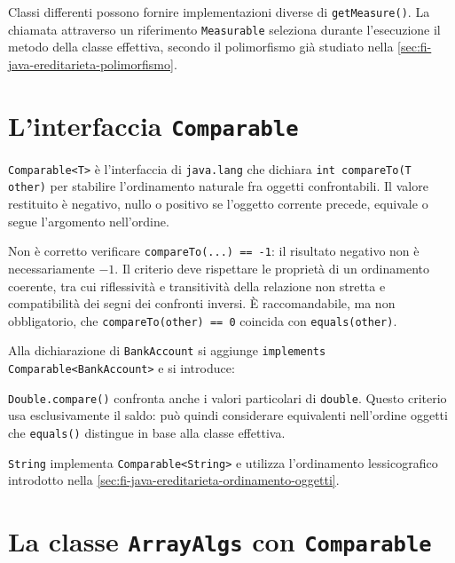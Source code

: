 Classi differenti possono fornire implementazioni diverse di
\texttt{getMeasure()}. La chiamata attraverso un riferimento
\texttt{Measurable} seleziona durante l'esecuzione il metodo
della classe effettiva, secondo il polimorfismo già studiato
nella \cref{sec:fi-java-ereditarieta-polimorfismo}.

\section{L'interfaccia \texttt{Comparable}}
\label{sec:fi-java-interfacce-comparable}

\begin{definition}
\label{def:fi-java-interfacce-comparable}
\texttt{Comparable<T>} è l'interfaccia di \texttt{java.lang}
che dichiara \texttt{int compareTo(T other)} per stabilire
l'ordinamento naturale fra oggetti confrontabili. Il valore
restituito è negativo, nullo o positivo se l'oggetto corrente
precede, equivale o segue l'argomento nell'ordine.
\end{definition}

Non è corretto verificare \lstinline|compareTo(...) == -1|:
il risultato negativo non è necessariamente \(-1\).
Il criterio deve rispettare le proprietà di un ordinamento
coerente, tra cui riflessività e transitività della relazione
non stretta e compatibilità dei segni dei confronti inversi.
È raccomandabile, ma non obbligatorio, che
\texttt{compareTo(other) == 0} coincida con \texttt{equals(other)}.

\begin{example}
Alla dichiarazione di \texttt{BankAccount} si aggiunge
\lstinline|implements Comparable<BankAccount>| e si introduce:



\texttt{Double.compare()} confronta anche i valori particolari
di \texttt{double}. Questo criterio usa esclusivamente il saldo:
può quindi considerare equivalenti nell'ordine oggetti che
\texttt{equals()} distingue in base alla classe effettiva.
\end{example}

\texttt{String} implementa \texttt{Comparable<String>} e
utilizza l'ordinamento lessicografico introdotto nella
\cref{sec:fi-java-ereditarieta-ordinamento-oggetti}.

\section{La classe \texttt{ArrayAlgs} con \texttt{Comparable}}
\label{sec:fi-java-interfacce-arrayalgs}

